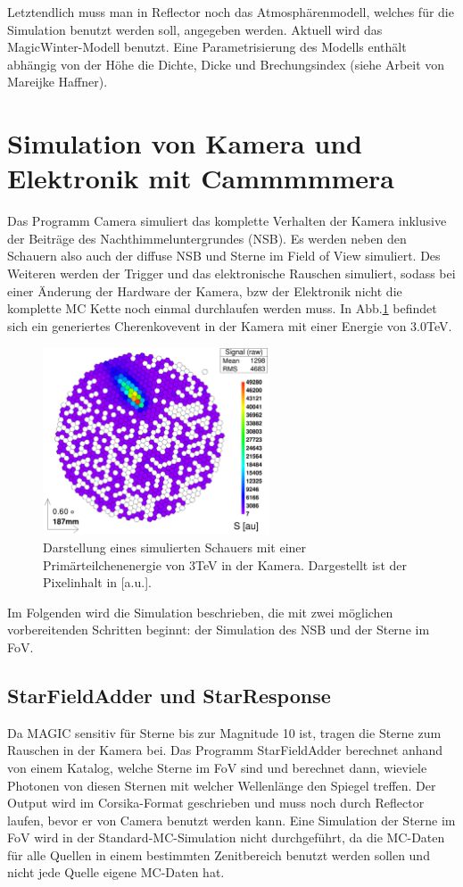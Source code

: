 Letztendlich muss man in Reflector noch das Atmosphärenmodell, welches für die Simulation benutzt werden soll, angegeben werden. 
Aktuell wird das MagicWinter-Modell benutzt. 
Eine Parametrisierung des Modells enthält abhängig von der Höhe die Dichte, Dicke und Brechungsindex (siehe Arbeit von Mareijke Haffner).


\section{Simulation von Kamera und Elektronik mit Cammmmmera}
Das Programm Camera simuliert das komplette Verhalten der Kamera inklusive der Beiträge des Nachthimmeluntergrundes (NSB).
Es werden neben den Schauern also auch der diffuse NSB und Sterne im Field of View simuliert. 
Des Weiteren werden der Trigger und das elektronische Rauschen simuliert, sodass bei einer Änderung der Hardware der Kamera, bzw der Elektronik nicht die komplette MC Kette noch einmal durchlaufen werden muss.
In Abb.\ref{Kamera-Bild} befindet sich ein generiertes Cherenkovevent in der Kamera mit einer Energie von 3.0TeV.

\begin{figure}
    \centering
    \includegraphics[width=0.6\textwidth]{./Plots/Signal_Job481_RunNr1513276_511_e3.0TeV_Zd32.2_fertig.png}
    \caption{Darstellung eines simulierten Schauers mit einer Primärteilchenenergie von 3TeV in der Kamera. Dargestellt ist der Pixelinhalt in [a.u.].}
    \label{Kamera-Bild}
\end{figure}

Im Folgenden wird die Simulation beschrieben, die mit zwei möglichen vorbereitenden Schritten beginnt: der Simulation des NSB und der Sterne im FoV.

\subsection{StarFieldAdder und StarResponse}
Da MAGIC sensitiv für Sterne bis zur Magnitude 10 ist, tragen die Sterne zum Rauschen in der Kamera bei.
Das Programm StarFieldAdder berechnet anhand von einem Katalog, welche Sterne im FoV sind und berechnet dann, wieviele Photonen von diesen Sternen mit welcher Wellenlänge den Spiegel treffen.
Der Output wird im Corsika-Format geschrieben und muss noch durch Reflector laufen, bevor er von Camera benutzt werden kann.
Eine Simulation der Sterne im FoV wird in der Standard-MC-Simulation nicht durchgeführt, da die MC-Daten für alle Quellen in einem bestimmten Zenitbereich benutzt werden sollen und nicht jede Quelle eigene MC-Daten hat.

